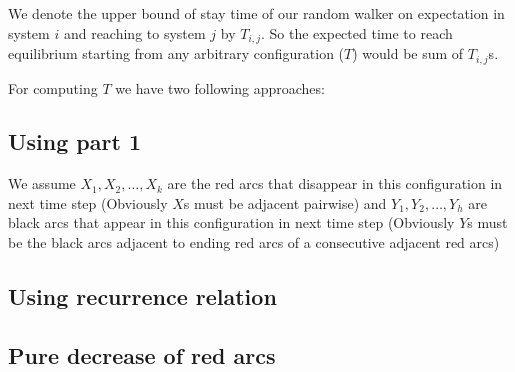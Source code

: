 \documentclass[]{book}
\theoremstyle{definition}
\begin{document}
We denote the upper bound of stay time of our random walker on expectation in system $i$ and reaching to system $j$ by $T_{i, j}$. So the expected time to reach equilibrium starting from any arbitrary configuration ($T$) would be sum of $T_{i,j}$s.



For computing $T$ we have two following approaches:
\subsection{Using  part 1}

We assume $X_1, X_2, \hdots, X_k$ are the red arcs that disappear in this configuration in next time step (Obviously $X$s must be adjacent pairwise) and $Y_1, Y_2, \hdots, Y_h$  are black arcs that appear in this configuration in next time step (Obviously $Y$s must be the black arcs adjacent to ending red arcs of a consecutive adjacent red arcs)


\subsection{Using recurrence relation}

\newpage

\subsection{Pure decrease of red arcs}
\end{document}
